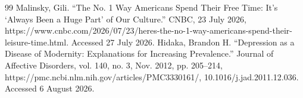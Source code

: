     {
        \raggedright
        \begin{thebibliography}{99}
            Malinsky, Gili. “The No. 1 Way Americans Spend Their Free Time: It's ‘Always Been a Huge Part’ of Our Culture.” CNBC, 23 July 2026, https://www.cnbc.com/2026/07/23/heres-the-no-1-way-americans-spend-their-leisure-time.html. Accessed 27 July 2026.
            Hidaka, Brandon H. “Depression as a Disease of Modernity: Explanations for Increasing Prevalence.” Journal of Affective Disorders, vol. 140, no. 3, Nov. 2012, pp. 205–214, https://pmc.ncbi.nlm.nih.gov/articles/PMC3330161/, 10.1016/j.jad.2011.12.036. Accessed 6 August 2026.

        \end{thebibliography}
    }